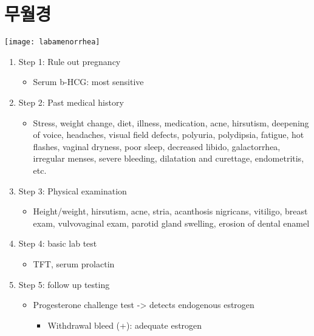 \section{무월경}
{}
\texttt{[image: labamenorrhea]}\\
\begin{enumerate}\tightlist
\item Step 1: Rule out pregnancy 
	\begin{itemize}\tightlist
	\item Serum b-HCG: most sensitive 
	\end{itemize}
\item Step 2: Past medical history 
	\begin{itemize}\tightlist
	\item Stress, weight change, diet, illness, medication, acne, hirsutism, deepening of voice, headaches, visual field defects, polyuria, polydipsia, fatigue, hot flashes, vaginal dryness, poor sleep, decreased libido, galactorrhea, irregular menses, severe bleeding, dilatation and curettage, endometritis, etc. 
	\end{itemize}
\item Step 3: Physical examination 
	\begin{itemize}\tightlist
	\item Height/weight, hirsutism, acne, stria, acanthosis nigricans, vitiligo, breast exam, vulvovaginal exam, parotid gland swelling, erosion of dental enamel
	\end{itemize}
\item Step 4: basic lab test
	\begin{itemize}\tightlist
	\item TFT, serum prolactin
	\end{itemize}
\item Step 5: follow up testing 
	\begin{itemize}\tightlist
	\item Progesterone challenge test -> detects endogenous estrogen
		\begin{itemize}\tightlist
		\item Withdrawal bleed (+): adequate estrogen

\end{itemize}
\end{itemize}
\end{enumerate}
